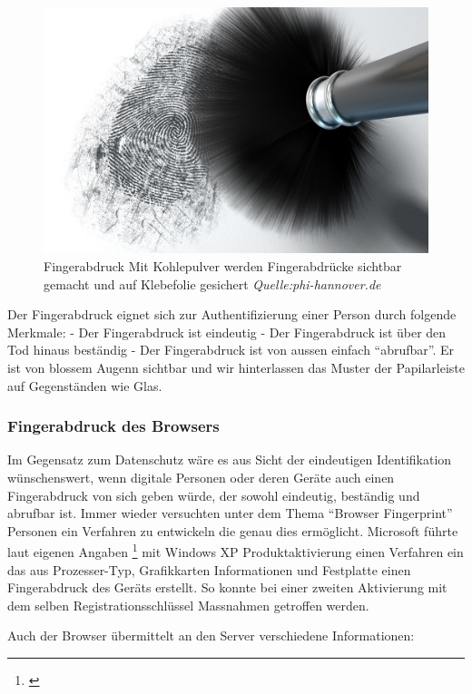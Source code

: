 \begin{figure}[htbp]
\centering
\includegraphics{images/fingerabdruck.jpg}
\caption{Fingerabdruck Mit Kohlepulver werden Fingerabdrücke sichtbar
gemacht und auf Klebefolie gesichert \emph{Quelle:phi-hannover.de}}
\end{figure}

Der Fingerabdruck eignet sich zur Authentifizierung einer Person durch
folgende Merkmale: - Der Fingerabdruck ist eindeutig - Der Fingerabdruck
ist über den Tod hinaus beständig - Der Fingerabdruck ist von aussen
einfach ``abrufbar''. Er ist von blossem Augenn sichtbar und wir
hinterlassen das Muster der Papilarleiste auf Gegenständen wie Glas.

\subsubsection{Fingerabdruck des
Browsers}\label{fingerabdruck-des-browsers}

Im Gegensatz zum Datenschutz wäre es aus Sicht der eindeutigen
Identifikation wünschenswert, wenn digitale Personen oder deren Geräte
auch einen Fingerabdruck von sich geben würde, der sowohl eindeutig,
beständig und abrufbar ist. Immer wieder versuchten unter dem Thema
``Browser Fingerprint'' Personen ein Verfahren zu entwickeln die genau
dies ermöglicht. Microsoft führte laut eigenen Angaben \footnote{\autocite{xpactivation}}
mit Windows XP Produktaktivierung einen Verfahren ein das aus
Prozesser-Typ, Grafikkarten Informationen und Festplatte einen
Fingerabdruck des Geräts erstellt. So konnte bei einer zweiten
Aktivierung mit dem selben Registrationsschlüssel Massnahmen getroffen
werden.

Auch der Browser übermittelt an den Server verschiedene Informationen:

